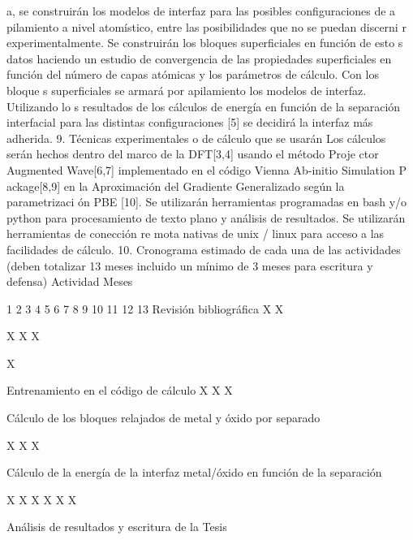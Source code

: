 a, se construirán los modelos de interfaz para las posibles configuraciones de a
pilamiento a nivel atomístico, entre las posibilidades que no se puedan discerni
r experimentalmente. Se construirán los bloques superficiales en función de esto
s datos haciendo un estudio de convergencia de las propiedades superficiales en 
función del número de capas atómicas y los parámetros de cálculo. Con los bloque
s superficiales se armará por apilamiento los modelos de interfaz. Utilizando lo
s resultados de los cálculos de energía en función de la separación interfacial 
para las distintas configuraciones [5] se decidirá la interfaz más adherida.
9. Técnicas experimentales o de cálculo que se usarán 
Los cálculos serán hechos dentro del marco de la DFT[3,4] usando el método Proje
ctor Augmented Wave[6,7] implementado en el código Vienna Ab-initio Simulation P
ackage[8,9] en la Aproximación del Gradiente Generalizado según la parametrizaci
ón PBE [10]. 
Se utilizarán herramientas programadas en bash y/o python para procesamiento de 
texto plano y análisis de resultados. Se utilizarán herramientas de conección re
mota nativas de unix / linux para acceso a las facilidades de cálculo.
10. Cronograma estimado de cada una de las actividades (deben totalizar 13 meses
 incluido un mínimo de 3 meses para escritura y defensa) 
Actividad
Meses

1
2
3
4
5
6
7
8
9
10
11
12
13
Revisión bibliográfica 
X
X




X
X
X

X


Entrenamiento en el código de cálculo
X
X
X










Cálculo de los bloques relajados de metal y óxido por separado


X
X
X








Cálculo de la energía de la interfaz metal/óxido en función de la separación




X
X
X
X
X
X



Análisis de resultados y escritura de la Tesis



